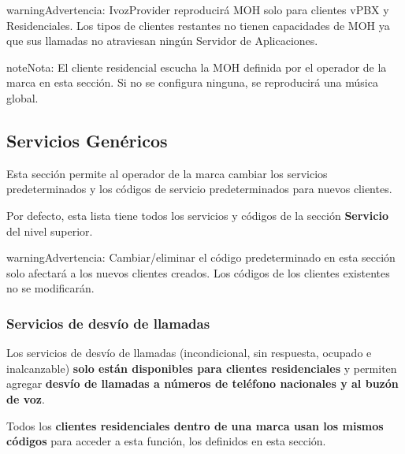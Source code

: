\documentclass[letterpaper,10pt,spanish]{sphinxmanual}
\begin{document}
\begin{notice}{warning}{Advertencia:}
IvozProvider reproducirá MOH solo para clientes vPBX y Residenciales. Los tipos de clientes restantes no tienen capacidades de MOH ya que sus llamadas no atraviesan ningún Servidor de Aplicaciones.
\end{notice}

\begin{notice}{note}{Nota:}
El cliente residencial escucha la MOH definida por el operador de la marca en esta sección. Si no se configura ninguna, se reproducirá una música global.
\end{notice}


\subsection{Servicios Genéricos}
\label{administration_portal/brand/settings/generic_services:generic-services}\label{administration_portal/brand/settings/generic_services::doc}\label{administration_portal/brand/settings/generic_services:brand-services}
Esta sección permite al operador de la marca cambiar los servicios predeterminados y los códigos de servicio predeterminados para nuevos clientes.

Por defecto, esta lista tiene todos los servicios y códigos de la sección \textbf{Servicio} del nivel superior.

\begin{notice}{warning}{Advertencia:}
Cambiar/eliminar el código predeterminado en esta sección solo afectará a los nuevos clientes creados. Los códigos de los clientes existentes no se modificarán.
\end{notice}


\subsubsection{Servicios de desvío de llamadas}
\label{administration_portal/brand/settings/generic_services:call-forward-services}\label{administration_portal/brand/settings/generic_services:id1}
Los servicios de desvío de llamadas (incondicional, sin respuesta, ocupado e inalcanzable) \textbf{solo están disponibles para clientes residenciales} y permiten agregar \textbf{desvío de llamadas a números de teléfono nacionales y al buzón de voz}.

Todos los \textbf{clientes residenciales dentro de una marca usan los mismos códigos} para acceder a esta función, los definidos en esta sección.
\end{document}
